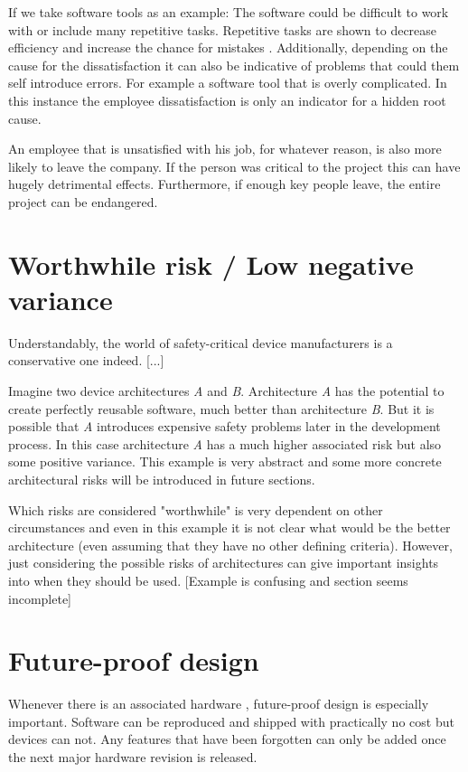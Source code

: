 If we take software tools as an example: The software could be difficult to work with or include many repetitive tasks. Repetitive tasks are shown to decrease efficiency and increase the chance for mistakes \cite{Wyatt.1937}. Additionally, depending on the cause for the dissatisfaction it can also be indicative of problems that could them self introduce errors. For example a software tool that is overly complicated. In this instance the employee dissatisfaction is only an indicator for a hidden root cause.

An employee that is unsatisfied with his job, for whatever reason, is also more likely to leave the company. If the person was critical to the project this can have hugely detrimental effects. Furthermore, if enough key people leave, the entire project can be endangered. 
\section{Worthwhile risk / Low negative variance}
Understandably, the world of safety-critical device manufacturers is a conservative one indeed. [...]

Imagine two device architectures \textit{A} and \textit{B}. Architecture \textit{A} has the potential to create perfectly reusable software, much better than architecture \textit{B}. But it is possible that \textit{A} introduces expensive safety problems later in the development process.
In this case architecture \textit{A} has a much higher associated risk but also  some positive variance. This example is very abstract and some more concrete architectural risks will be introduced in future sections. 

Which risks are considered "worthwhile" is very dependent on other circumstances and even in this example it is not clear what would be the better architecture (even assuming that they have no other defining criteria). However, just considering the possible risks of architectures can give important insights into when they should be used.
[Example is confusing and section seems incomplete]
\section{Future-proof design}
Whenever there is an associated hardware , future-proof design is especially important. Software can be reproduced and shipped with practically no cost but devices can not. Any features that have been forgotten can only be added once the next major hardware revision is released.


